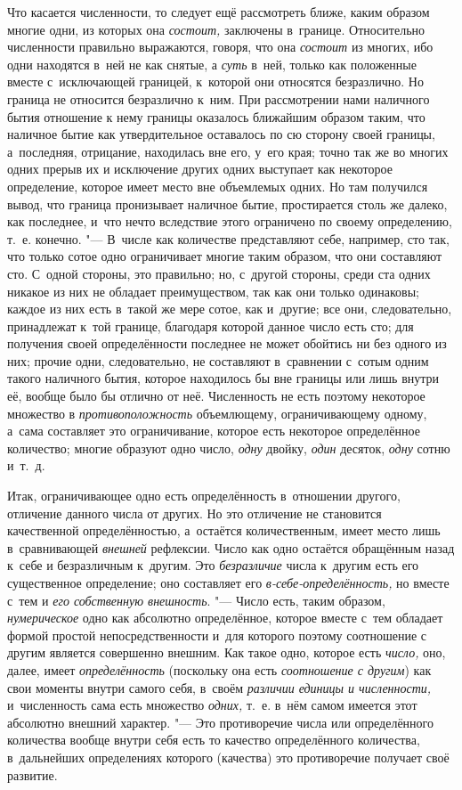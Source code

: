 Что касается численности, то следует ещё рассмотреть ближе, каким образом
многие одни, из которых она {\em состоит,} заключены в~границе. Относительно
численности правильно выражаются, говоря, что она {\em состоит} из многих, ибо
одни находятся в~ней не как снятые, а {\em суть} в~ней, только как положенные
вместе с~исключающей границей, к~которой они относятся безразлично. Но граница
не относится безразлично к~ним. При рассмотрении нами наличного бытия отношение
к нему границы оказалось ближайшим образом таким, что наличное бытие как
утвердительное оставалось по сю сторону своей границы, а~последняя, отрицание,
находилась вне его, у~его края; точно так же во многих одних прерыв их и
исключение других одних выступает как некоторое определение, которое имеет
место вне объемлемых одних. Но там получился вывод, что граница пронизывает
наличное бытие, простирается столь же далеко, как последнее, и~что нечто
вследствие этого ограничено по своему определению, т.~е. конечно. "---
В~числе как количестве представляют себе, например, сто так,
что только сотое одно ограничивает многие таким образом, что они составляют
сто. С~одной стороны, это правильно; но, с~другой стороны, среди ста одних
никакое из них не обладает преимуществом, так как они только одинаковы; каждое
из них есть в~такой же мере сотое, как и~другие; все они, следовательно,
принадлежат к~той границе, благодаря которой данное число есть сто; для
получения своей определённости последнее не может обойтись ни без одного из
них; прочие одни, следовательно, не составляют в~сравнении с~сотым одним такого
наличного бытия, которое находилось бы вне границы или лишь внутри её, вообще
было бы отлично от неё. Численность не есть поэтому некоторое множество в {\em
противоположность} объемлющему, ограничивающему одному, а~сама составляет это
ограничивание, которое есть некоторое определённое количество; многие образуют
одно число, {\em одну} двойку, {\em один} десяток, {\em одну} сотню и~т.~д.

Итак, ограничивающее одно есть определённость в~отношении другого, отличение
данного числа от других. Но это отличение не становится качественной
определённостью, а~остаётся количественным, имеет место лишь в~сравнивающей
{\em внешней} рефлексии. Число как одно остаётся обращённым назад к~себе и
безразличным к~другим. Это {\em безразличие} числа к~другим есть его
существенное определение; оно составляет его {\em в-себе-определённость,} но
вместе с~тем и {\em его собственную внешность}. "--- Число есть, таким образом,
{\em нумерическое} одно как абсолютно определённое, которое вместе с~тем
обладает формой простой непосредственности и~для которого поэтому соотношение с
другим является совершенно внешним. Как такое одно, которое есть {\em число,}
оно, далее, имеет {\em определённость} (поскольку она есть {\em соотношение с
другим}) как свои моменты внутри самого себя, в~своём {\em различии единицы и
численности,} и~численность сама есть множество {\em одних,} т.~е. в~нём самом
имеется этот абсолютно внешний характер. "--- Это противоречие числа или
определённого количества вообще внутри себя есть то качество определённого
количества, в~дальнейших определениях которого (качества) это противоречие
получает своё развитие.

